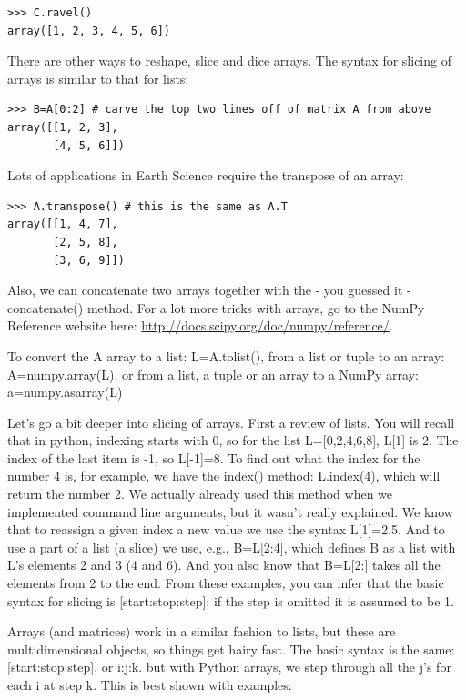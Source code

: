 \documentclass[11pt]{book}
\begin{document}
{{{   { \color{blue} \begin{verbatim}
>>> C.ravel()
array([1, 2, 3, 4, 5, 6])
\end{verbatim}}   

There are other ways to reshape, slice and dice arrays.  
The syntax for slicing of arrays is similar to that for lists:  
{ \color{blue} \begin{verbatim}
>>> B=A[0:2] # carve the top two lines off of matrix A from above
array([[1, 2, 3],
       [4, 5, 6]])
\end{verbatim}}

Lots of applications in Earth Science require the transpose of an array:
{ \color{blue} \begin{verbatim}
>>> A.transpose() # this is the same as A.T  
array([[1, 4, 7],
       [2, 5, 8],
       [3, 6, 9]])
\end{verbatim}}

Also, we can concatenate two arrays together with the - you guessed it - {\color{blue}concatenate()} method.   For a lot more tricks with arrays, go to the NumPy Reference website here:  \url{http://docs.scipy.org/doc/numpy/reference/}.   


To convert the {\color{blue}A} array to a list:   {\color{blue}L=A.tolist()},  from a list or tuple to an array:   {\color{blue}A=numpy.array(L)}, or from a list, a tuple or an array to a NumPy array:   {\color{blue}a=numpy.asarray(L)}

Let's go a bit deeper into slicing of arrays.  First a review of lists.   You will recall that in  python, indexing starts with 0, so for the list {\color{blue} L=[0,2,4,6,8], L[1]} is 2. The index of the last item is -1, so  {\color{blue}L[-1]}=8.  To find out what the index for the number 4 is, for example, we have the {\color{blue}index()} method:  {\color{blue}L.index(4}), which will return the number 2. We actually already used this method when we implemented command line arguments, but it wasn't really explained.   We know that to reassign a given index a new value we use the syntax {\color{blue}L[1]=2.5}.  
And to use a part of a list (a slice) we use, e.g.,    {\color{blue}B=L[2:4]}, which  defines  {\color{blue}B} as a list with  {\color{blue}L}'s elements 2 and 3 (4 and 6).  And you also know that  {\color{blue}B=L[2:]} takes all the elements from 2 to the end.  
From these examples, you can infer that the basic syntax for slicing is  {\color{blue}[start:stop:step]}; if the step is omitted it is assumed to be 1.  

Arrays (and matrices) work in a similar fashion to lists, but these are multidimensional objects, so things get hairy fast.
The basic syntax is the same:  {\color{blue}[start:stop:step]},  or  {\color{blue}i:j:k}.   but with Python arrays, we step through all the  {\color{blue}j}'s for each  {\color{blue}i}  at step  {\color{blue}k}.  This is best shown with examples:


}}}
\end{document}
